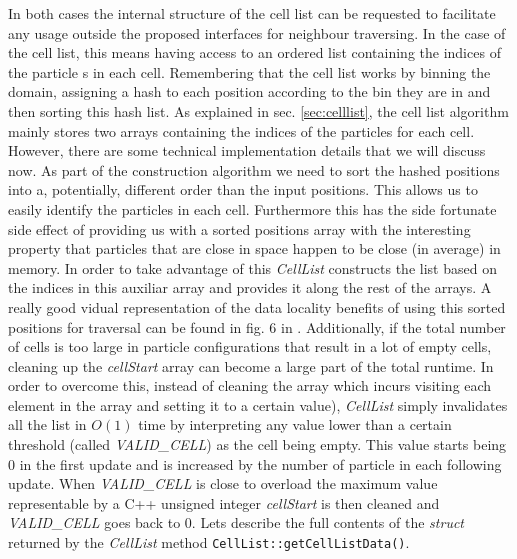 \documentclass[ twoside,openright,titlepage,numbers=noenddot,%
headinclude,footinclude,cleardoublepage=empty,abstract=on,
BCOR=5mm,paper=a4,fontsize=11pt, dvipsnames
]{scrreprt}
\def\ucpp{uammd_cpp_lexer.py:UAMMDCppLexer -x}
\begin{document}
In both cases the internal structure of the cell list can be requested to facilitate any usage outside the proposed interfaces for neighbour traversing. In the case of the cell list, this means having access to an ordered list containing the indices of the particle s in each cell. Remembering that the cell list works by binning the domain, assigning a hash to each position according to the bin they are in and then sorting this hash list.
As explained in sec. \ref{sec:celllist}, the cell list algorithm mainly stores two arrays containing the indices of the particles for each cell.
However, there are some technical implementation details that we will discuss now.
As part of the construction algorithm we need to sort the hashed positions into a, potentially, different order than the input positions. This allows us to easily identify the particles in each cell. Furthermore this has the side fortunate side effect of providing us with a sorted positions array with the interesting property that particles that are close in space happen to be close (in average) in memory. In order to take advantage of this \emph{CellList} constructs the list based on the indices in this auxiliar array and provides it along the rest of the arrays.
A really good vidual representation of the data locality benefits of using this sorted positions for traversal can be found in fig. 6 in \cite{Tang2014}.
Additionally, if the total number of cells is too large in particle configurations that result in a lot of empty cells, cleaning up the \emph{cellStart} array can become a large part of the total runtime. In order to overcome this, instead of cleaning the array which incurs visiting each element in the array and setting it to a certain value), \emph{CellList} simply invalidates all the list in $O(1)$ time by interpreting any value lower than a certain threshold (called \emph{VALID\_CELL}) as the cell being empty.
This value starts being $0$ in the first update and is increased by the number of particle in each following update. When \emph{VALID\_CELL} is close to overload the maximum value representable by a C++ unsigned integer \emph{cellStart} is then cleaned and \emph{VALID\_CELL} goes back to $0$.
Lets describe the full contents of the \emph{struct} returned by the \emph{CellList} method \texttt{CellList::getCellListData()}.
\end{document}
